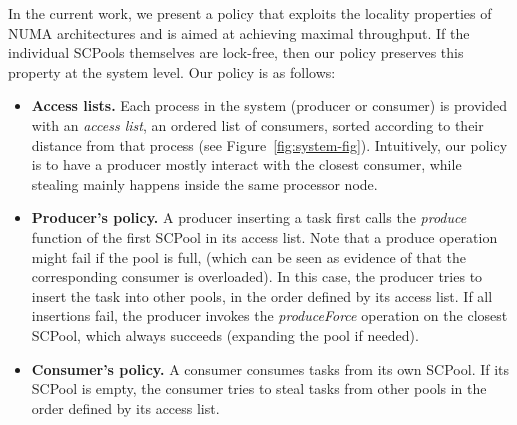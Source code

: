 In the current work, we present a policy that exploits the locality properties of NUMA architectures and is aimed at achieving maximal throughput. If the individual SCPools themselves are lock-free, then our policy preserves this property at the system level. Our policy is as follows:
\begin{itemize}
	\item {\bf Access lists.} Each process in the system (producer or consumer) is provided with an \emph{access list}, an ordered list of consumers, sorted according to their distance from that process (see Figure~\ref{fig:system-fig}). Intuitively, our policy is to have a producer mostly interact with the closest consumer, while stealing mainly happens inside the same processor node. 
	\item {\bf Producer's policy.} A producer inserting a task first calls the \emph{produce} function of the first SCPool in its access list. Note that a produce operation might fail if the pool is full, (which can be seen as evidence of that the corresponding consumer is overloaded).  In this case, the producer tries to insert the task into other pools, in the order defined by its access list. If all insertions fail, the producer invokes the \emph{produceForce} operation on the closest SCPool, which always succeeds (expanding the pool if needed). 
	\item {\bf Consumer's policy.} A consumer consumes tasks from its own SCPool. If its SCPool is empty, the consumer tries to steal tasks from other pools in the order defined by its access list. 
\end{itemize}





